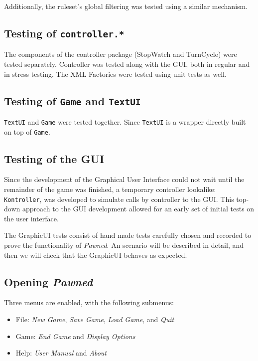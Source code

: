 												Additionally, the ruleset's global filtering was tested using a similar mechanism.
												
	\subsection{Testing of \texttt{controller.*}}The components of the controller package (StopWatch and TurnCycle) 
						were tested separately. Controller was tested along with the GUI, both in regular and in stress 
						testing. The XML Factories were tested using unit tests as well. 

	\subsection{Testing of \texttt{Game} and \texttt{TextUI}} \texttt{TextUI} and \texttt{Game} were tested together. 
	Since \texttt{TextUI} is a wrapper directly built on top of \texttt{Game}. 
	
	\subsection{Testing of the GUI} Since the development of the Graphical User Interface could not wait until 
	the remainder of the game was finished, a temporary controller lookalike: \texttt{Kontroller}, was developed 
	to simulate calls by controller to the GUI. This top-down approach to the GUI development allowed for an early
	set of initial tests on the user interface.
	
		The GraphicUI tests consist of hand made tests carefully chosen and recorded
		to prove the functionality of \emph{Pawned}. An scenario will be described in 
		detail, and then we will check that the GraphicUI behaves as expected.
				
		\subsection{Opening \textit{Pawned}} 
		
		Three menus are enabled, with the following submenus: 
		\begin{itemize}
			\item File: \textit{New Game}, \textit{Save Game}, \textit{Load Game}, and 
									\textit{Quit}
			\item Game: \textit{End Game} and \textit{Display Options}  
			\item Help: \textit{User Manual} and \textit{About}
		\end{itemize}
		
